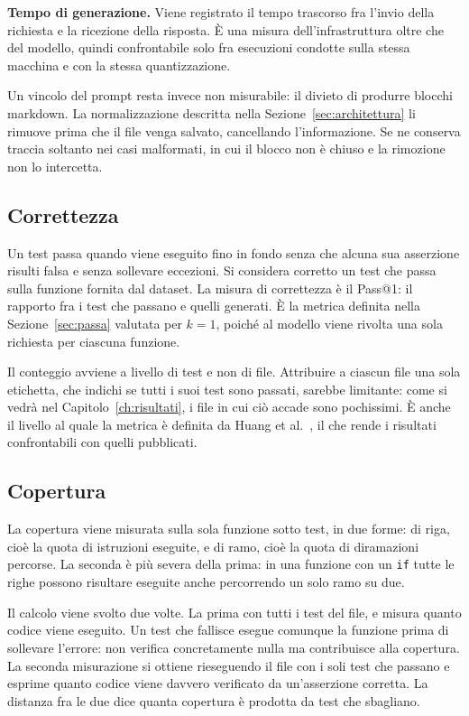 \textbf{Tempo di generazione.} Viene registrato il tempo trascorso fra l'invio
della richiesta e la ricezione della risposta. È una misura dell'infrastruttura
oltre che del modello, quindi confrontabile solo fra esecuzioni condotte sulla
stessa macchina e con la stessa quantizzazione.

Un vincolo del prompt resta invece non misurabile: il divieto di produrre
blocchi markdown. La normalizzazione descritta nella
Sezione~\ref{sec:architettura} li rimuove prima che il file venga salvato,
cancellando l'informazione. Se ne conserva traccia soltanto nei casi malformati,
in cui il blocco non è chiuso e la rimozione non lo intercetta.

\subsection{Correttezza} 
\label{sec:correttezza-misura}
Un test passa quando viene eseguito fino in fondo senza che alcuna sua asserzione risulti falsa e senza sollevare eccezioni. Si considera corretto un test che passa sulla funzione fornita dal dataset. La misura di correttezza è il Pass@1: il rapporto fra i test che passano e quelli generati. È la metrica definita nella Sezione~\ref{sec:passa} valutata per $k = 1$, poiché al modello viene
rivolta una sola richiesta per ciascuna funzione.

Il conteggio avviene a livello di test e non di file. Attribuire a ciascun file
una sola etichetta, che indichi se tutti i suoi test sono passati, sarebbe
limitante: come si vedrà nel Capitolo~\ref{ch:risultati}, i file in cui ciò
accade sono pochissimi. È anche il livello al quale la metrica è definita da
Huang et al.~\cite{huang2025ult}, il che rende i risultati confrontabili con
quelli pubblicati.

\subsection{Copertura}
\label{sec:copertura}
La copertura viene misurata sulla sola funzione sotto test,
in due forme: di riga, cioè la quota di istruzioni eseguite, e di ramo, cioè la
quota di diramazioni percorse. La seconda è più severa della prima: in una
funzione con un \texttt{if} tutte le righe possono risultare eseguite anche
percorrendo un solo ramo su due.

Il calcolo viene svolto due volte. La prima con tutti i test del file, e misura
quanto codice viene eseguito. Un test che fallisce esegue comunque la funzione prima di sollevare l'errore: non verifica concretamente nulla ma contribuisce alla copertura. La seconda misurazione si ottiene rieseguendo il file con i soli test che passano e esprime quanto codice viene davvero verificato da un'asserzione corretta. La distanza fra le due dice quanta copertura è prodotta da test che sbagliano.

